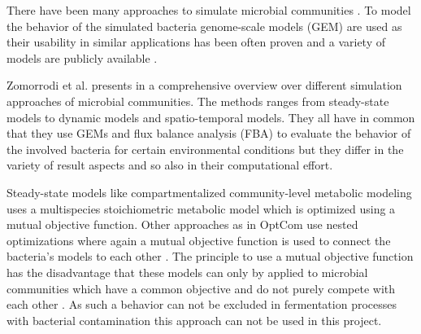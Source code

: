 

There have been many approaches to simulate microbial communities \cite{ZOMORRODI2016837}. To model the behavior of the simulated bacteria
genome-scale models (GEM) are used as their usability in similar applications has been often proven and a variety of models are publicly
available \cite{6915830}.

Zomorrodi et al. presents in \cite{ZOMORRODI2016837} a comprehensive overview over different simulation approaches of microbial communities.
The methods ranges from steady-state models to dynamic models and spatio-temporal models. They all have in common that they use GEMs and
flux balance analysis (FBA) to evaluate the behavior of the involved bacteria for certain environmental conditions but they differ in the
variety of result aspects and so also in their computational effort.

Steady-state models like compartmentalized community-level metabolic modeling uses a multispecies stoichiometric metabolic model
\cite{Stolyar92} which is optimized using a mutual objective function. Other approaches as in OptCom use nested optimizations where again
a mutual objective function is used to connect the bacteria's models to each other \cite{zomorrodi2012optcom}. The principle to use a mutual
objective function has the disadvantage that these models can only by applied to microbial communities which have a common objective and do
not purely compete with each other \cite{ZOMORRODI2016837}. As such a behavior can not be excluded in fermentation processes with bacterial
contamination this approach can not be used in this project.

